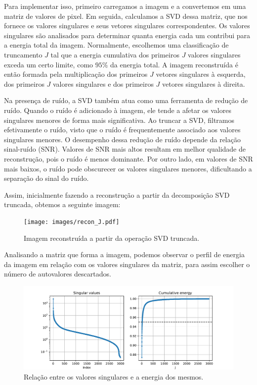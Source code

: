 	Para implementar isso, primeiro carregamos a imagem e a convertemos em uma matriz de valores de pixel. Em seguida, calculamos a SVD dessa matriz, que nos fornece os valores singulares e seus vetores singulares correspondentes. Os valores singulares são analisados para determinar quanta energia cada um contribui para a energia total da imagem. Normalmente, escolhemos uma classificação de truncamento $J$ tal que a energia cumulativa dos primeiros $J$ valores singulares exceda um certo limite, como $95\%$ da energia total. A imagem reconstruída é então formada pela multiplicação dos primeiros $J$ vetores singulares à esquerda, dos primeiros $J$ valores singulares e dos primeiros $J$ vetores singulares à direita.
	
	Na presença de ruído, a SVD também atua como uma ferramenta de redução de ruído. Quando o ruído é adicionado à imagem, ele tende a afetar os valores singulares menores de forma mais significativa. Ao truncar a SVD, filtramos efetivamente o ruído, visto que o ruído é frequentemente associado aos valores singulares menores. O desempenho dessa redução de ruído depende da relação sinal-ruído (SNR). Valores de SNR mais altos resultam em melhor qualidade de reconstrução, pois o ruído é menos dominante. Por outro lado, em valores de SNR mais baixos, o ruído pode obscurecer os valores singulares menores, dificultando a separação do sinal do ruído.
	
	Assim, inicialmente fazendo a reconstrução a partir da decomposição SVD truncada, obtemos a seguinte imagem:
	
	\begin{figure}[!h]
		\centering
		\texttt{[image: images/recon\_J.pdf]}
		\caption{Imagem reconstruída a partir da operação SVD truncada.}
		\label{fig:wave}
	\end{figure}
	
	Analisando a matriz que forma a imagem, podemos observar o perfil de energia da imagem em relação com os valores singulares da matriz, para assim escolher o número de autovalores descartados.
	
	\begin{figure}[!h]
		\centering
		\includegraphics[width=\linewidth]{images/sing_value_to_energy.pdf}
		\caption{Relação entre os valores singulares e a energia dos mesmos.}
		\label{fig:mse_wave}
	\end{figure}
	
